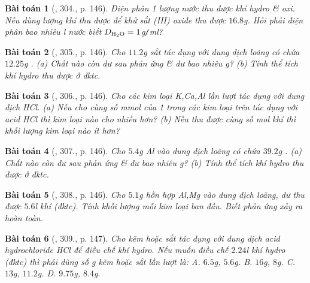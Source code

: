 \documentclass{article}
\newtheorem{baitoan}{Bài toán}
\begin{document}
\begin{baitoan}[\cite{An_400_BT_Hoa_Hoc_8_2020}, 304., p. 146]
	Điện phân 1 lượng nước thu được khí hydro \& oxi. Nếu dùng lượng khí \emph{} thu được để khử sắt (III) oxide thu được $16.8$\emph{g}. Hỏi phải điện phân bao nhiêu \emph{l} nước biết $D_{\ce{H2O}} = 1$\emph{g\texttt{/}ml}?
\end{baitoan}

\begin{baitoan}[\cite{An_400_BT_Hoa_Hoc_8_2020}, 305., p. 146]
	Cho $11.2$\emph{g} sắt tác dụng với dung dịch \emph{} loãng có chứa $12.25$\emph{g }. (a) Chất nào còn dư sau phản ứng \& dư bao nhiêu \emph{g}? (b) Tính thể tích khí hydro thu được ở đktc.
\end{baitoan}

\begin{baitoan}[\cite{An_400_BT_Hoa_Hoc_8_2020}, 306., p. 146]
	Cho các kim loại \emph{K,Ca,Al} lần lượt tác dụng với dung dịch \emph{HCl}. (a) Nếu cho cùng số mmol của 1 trong các kim loại trên tác dụng với acid \emph{HCl} thì kim loại nào cho nhiều \emph{} hơn? (b) Nếu thu được cùng số mol khí \emph{} thì khối lượng kim loại nào ít hơn?
\end{baitoan}

\begin{baitoan}[\cite{An_400_BT_Hoa_Hoc_8_2020}, 307., p. 146]
	Cho $5.4$\emph{g Al} vào dung dịch \emph{} loãng có chứa $39.2$\emph{g }. (a) Chất nào còn dư sau phản ứng \& dư bao nhiêu \emph{g}? (b) Tính thể tích khí hydro thu được ở đktc.
\end{baitoan}

\begin{baitoan}[\cite{An_400_BT_Hoa_Hoc_8_2020}, 308., p. 146]
	Cho $5.1$\emph{g} hỗn hợp \emph{Al,Mg} vào dung dịch \emph{} loãng, dư thu được $5.6$\emph{l} khí \emph{} (đktc). Tính khối lượng mỗi kim loại ban đầu. Biết phản ứng xảy ra hoàn toàn.
\end{baitoan}

\begin{baitoan}[\cite{An_400_BT_Hoa_Hoc_8_2020}, 309., p. 147]
	Cho kẽm hoặc sắt tác dụng với dung dịch acid hydrochloride \emph{HCl} để điều chế khí hydro. Nếu muốn điều chế $2.24$\emph{l} khí hydro (đktc) thì phải dùng số \emph{g} kẽm hoặc sắt lần lượt là: {\sf A.} $6.5$\emph{g}, $5.6$\emph{g}. {\sf B.} $16$\emph{g}, $8$\emph{g}. {\sf C.} $13$\emph{g}, $11.2$\emph{g}. {\sf D.} $9.75$\emph{g}, $8.4$\emph{g}.
\end{baitoan}
\end{document}
